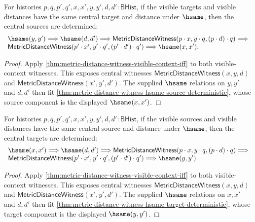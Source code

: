 \begin{theorem}
\label{thm:metric-distance-witness-visible-context-hsame-source-deterministic}
For histories $p,q,p',q',x,x',y,y',d,d':\mathsf{BHist}$, if the visible
targets and visible distances have the same central target and distance under
$\hsame$, then the central sources are determined:
$$
\begin{array}{l}
\hsame(y,y')\Longrightarrow
\hsame(d,d')\Longrightarrow
\mathsf{MetricDistanceWitness}(p\cdot x,y\cdot q,(p\cdot d)\cdot q)
\Longrightarrow
\\
\mathsf{MetricDistanceWitness}(p'\cdot x',y'\cdot q',(p'\cdot d')\cdot q')
\Longrightarrow
\hsame(x,x').
\end{array}
$$
\end{theorem}
\begin{proof}
Apply \autoref{thm:metric-distance-witness-visible-context-iff} to both
visible-context witnesses. This exposes central witnesses
$\mathsf{MetricDistanceWitness}(x,y,d)$ and
$\mathsf{MetricDistanceWitness}(x',y',d')$. The supplied $\hsame$ relations
on $y,y'$ and $d,d'$ then fit
\autoref{thm:metric-distance-witness-hsame-source-deterministic}, whose source
component is the displayed $\hsame(x,x')$.
\end{proof}

\begin{theorem}
\label{thm:metric-distance-witness-visible-context-hsame-target-deterministic}
For histories $p,q,p',q',x,x',y,y',d,d':\mathsf{BHist}$, if the visible
sources and visible distances have the same central source and distance under
$\hsame$, then the central targets are determined:
$$
\begin{array}{l}
\hsame(x,x')\Longrightarrow
\hsame(d,d')\Longrightarrow
\mathsf{MetricDistanceWitness}(p\cdot x,y\cdot q,(p\cdot d)\cdot q)
\Longrightarrow
\\
\mathsf{MetricDistanceWitness}(p'\cdot x',y'\cdot q',(p'\cdot d')\cdot q')
\Longrightarrow
\hsame(y,y').
\end{array}
$$
\end{theorem}
\begin{proof}
Apply \autoref{thm:metric-distance-witness-visible-context-iff} to both
visible-context witnesses. This exposes central witnesses
$\mathsf{MetricDistanceWitness}(x,y,d)$ and
$\mathsf{MetricDistanceWitness}(x',y',d')$. The supplied $\hsame$ relations
on $x,x'$ and $d,d'$ then fit
\autoref{thm:metric-distance-witness-hsame-target-deterministic}, whose target
component is the displayed $\hsame(y,y')$.
\end{proof}

